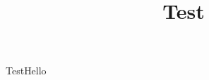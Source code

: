 ﻿\documentclass[aspectratio=169]{beamer}
\title{Test}
\begin{document}
\begin{frame}{Test}\small Hello\end{frame}
\end{document}
